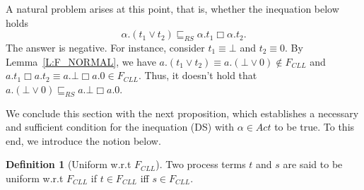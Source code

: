 \documentclass{elsarticle}
\theoremstyle{plain}
\theoremstyle{definition}
\newtheorem{mydefn}[theorem]{Definition}
\begin{document}
A natural problem arises at this point, that is, whether the inequation below holds
\[\alpha.(t_1 \vee t_2) \sqsubseteq_{RS} \alpha.t_1 \Box \alpha.t_2. \tag{DS}\]
The answer is negative.
For instance, consider $t_1 \equiv \bot$ and $t_2 \equiv 0$.
By Lemma~\ref{L:F_NORMAL}, we have $a.(t_1\vee t_2)\equiv a.(\bot \vee 0)\notin F_{CLL}$ and $a.t_1 \Box a.t_2 \equiv a.\bot \Box a.0 \in F_{CLL}$.
Thus, it doesn't hold that $a.(\bot \vee 0) \sqsubseteq_{RS} a.\bot \Box a.0$.

We conclude this section with the next proposition, which establishes a necessary and sufficient condition for the inequation (DS) with $\alpha \in  Act$ to be true.
To this end, we introduce the notion below.

\begin{mydefn}[Uniform w.r.t $F_{CLL}$]
  Two process terms $t$ and $s$ are said to be uniform w.r.t $F_{CLL}$ if $t\in F_{CLL}$ iff $s \in F_{CLL}$.
\end{mydefn}
\end{document}
